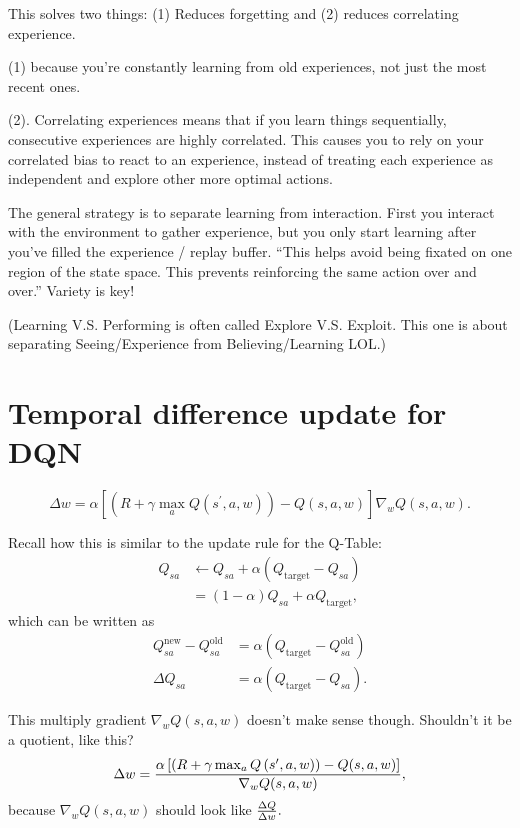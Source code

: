 \documentclass[10pt]{article}
\theoremstyle{plain}
\theoremstyle{definition}
\theoremstyle{remark}
\renewcommand\frac[2]{\genfrac{}{}{0.5pt}{}{#1}{#2}}
\newcommand{\0}{\varnothing}
\newcommand{\<}{\langle}
\renewcommand{\>}{\rangle}
\begin{document}
This solves two things: (1) Reduces forgetting and (2) reduces correlating experience.

(1) because you're constantly learning from old experiences, not just the most recent ones.

(2). Correlating experiences means that if you learn things sequentially,
consecutive experiences are highly correlated. This causes you to rely on your
correlated bias to react to an experience, instead of treating each experience
as independent and explore other more optimal actions.

The general strategy is to separate learning from interaction. First you interact with the environment to gather experience, but you only start learning after you've filled the experience / replay buffer. ``This helps avoid being fixated on one region of the state space. This prevents reinforcing the same action over and over.'' Variety is key!

(Learning V.S. Performing is often called Explore V.S. Exploit. This one is about separating Seeing/Experience from Believing/Learning LOL.)

\section{Temporal difference update for DQN}

$$
\Delta w = \alpha \left[ \left( R + \gamma \max _ { a } Q \left( s ^ { \prime } , a , w \right) \right) - Q ( s , a , w ) \right] \nabla _ { w } Q ( s , a , w ).
$$

Recall how this is similar to the update rule for the Q-Table:
\begin{align*}
Q_{sa} &\gets Q_{sa} + \alpha (Q_{\text{target}} - Q_{sa}) \\
&= (1 - \alpha) Q_{sa} + \alpha Q_{\text{target}},
\end{align*}
which can be written as
\begin{align*}
Q^{\text{new}}_{sa} - Q^{\text{old}}_{sa} &= \alpha (Q_{\text{target}} - Q^{\text{old}}_{sa}) \\
\Delta Q_{sa} &= \alpha (Q_{\text{target}} - Q_{sa}).
\end{align*}

This multiply gradient $ \nabla _ { w } Q ( s , a , w ) $ doesn't make sense though. Shouldn't it be a quotient, like this?
$$
\Delta w = \frac{\alpha \left[ \left( R + \gamma \max _ { a } Q \left( s ^ { \prime } , a , w \right) \right) - Q ( s , a , w ) \right]}{\nabla _ { w } Q ( s , a , w )},
$$
because $ \nabla _ { w } Q ( s , a , w ) $ should look like $ \frac{\Delta Q }{\Delta w}. $
\end{document}
